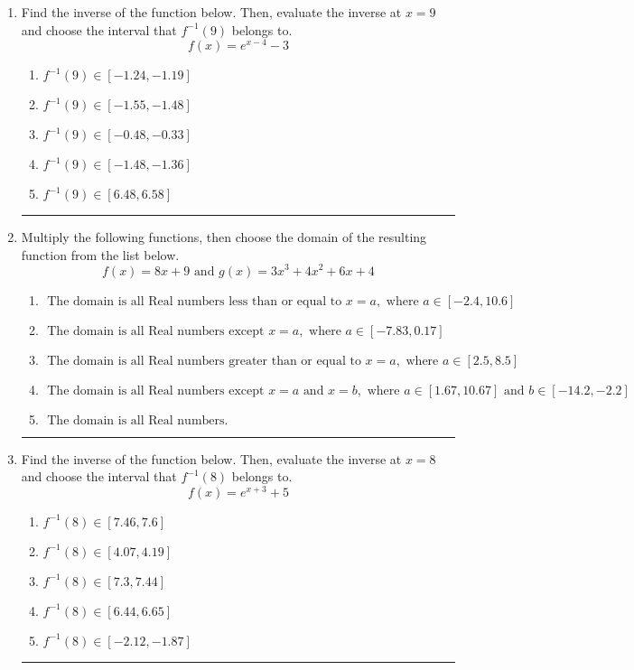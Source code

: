 \documentclass[14pt]{extbook}
\newcommand{\litem}[1]{\item#1\hspace*{-1cm}\rule{\textwidth}{0.4pt}}
\begin{document}
\begin{enumerate}
{\begin{enumerate}[label=\Alph*.]
\end{enumerate} }
\litem{
Find the inverse of the function below. Then, evaluate the inverse at $x = 9$ and choose the interval that $f^{-1}(9)$ belongs to.\[ f(x) = e^{x-4}-3 \]\begin{enumerate}[label=\Alph*.]
\item \( f^{-1}(9) \in [-1.24, -1.19] \)
\item \( f^{-1}(9) \in [-1.55, -1.48] \)
\item \( f^{-1}(9) \in [-0.48, -0.33] \)
\item \( f^{-1}(9) \in [-1.48, -1.36] \)
\item \( f^{-1}(9) \in [6.48, 6.58] \)

\end{enumerate} }
\litem{
Multiply the following functions, then choose the domain of the resulting function from the list below.\[ f(x) = 8x + 9 \text{ and } g(x) = 3x^{3} +4 x^{2} +6 x + 4 \]\begin{enumerate}[label=\Alph*.]
\item \( \text{ The domain is all Real numbers less than or equal to } x = a, \text{ where } a \in [-2.4, 10.6] \)
\item \( \text{ The domain is all Real numbers except } x = a, \text{ where } a \in [-7.83, 0.17] \)
\item \( \text{ The domain is all Real numbers greater than or equal to } x = a, \text{ where } a \in [2.5, 8.5] \)
\item \( \text{ The domain is all Real numbers except } x = a \text{ and } x = b, \text{ where } a \in [1.67, 10.67] \text{ and } b \in [-14.2, -2.2] \)
\item \( \text{ The domain is all Real numbers. } \)

\end{enumerate} }
\litem{
Find the inverse of the function below. Then, evaluate the inverse at $x = 8$ and choose the interval that $f^{-1}(8)$ belongs to.\[ f(x) = e^{x+3}+5 \]\begin{enumerate}[label=\Alph*.]
\item \( f^{-1}(8) \in [7.46, 7.6] \)
\item \( f^{-1}(8) \in [4.07, 4.19] \)
\item \( f^{-1}(8) \in [7.3, 7.44] \)
\item \( f^{-1}(8) \in [6.44, 6.65] \)
\item \( f^{-1}(8) \in [-2.12, -1.87] \)

\end{enumerate} }
\end{enumerate}
\end{document}
